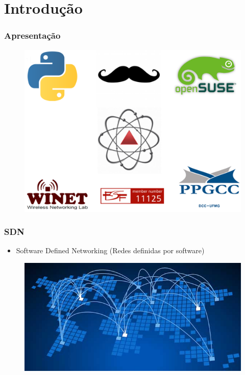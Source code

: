 %
%
\section{Introdução}


%
%
\begin{frame}\frametitle{Apresentação}

	\begin{figure}[h]
        \centering
        \includegraphics[scale=0.25]{images/community.png}
    \end{figure}
\end{frame}

%
%
\begin{frame}\frametitle{SDN}

    \begin{itemize}
    \item Software Defined Networking (Redes definidas por software)
    \end{itemize}
    	\begin{figure}[h]
        \centering
        \includegraphics[scale=0.5]{images/sdn.jpg}
    \end{figure}
\end{frame}


